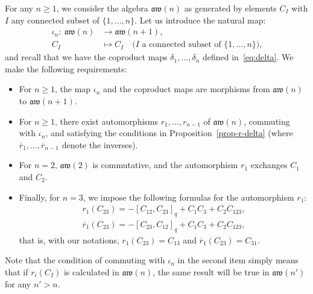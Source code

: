 \documentclass[pdftex]{sigma}
\numberwithin{equation}{section}
\theoremstyle{definition}
\newcommand{\rb}{\overline{r}}
\newcommand{\aw}{\mathfrak{aw}(n)}
\begin{document}
For any $n\geq 1$, we consider the algebra $\aw$ as generated by elements $C_I$ with $I$ any connected subset of $\{1,\dots,n\}$. Let us introduce the natural map:
\begin{align*} \iota_n\colon \ \aw & \to \mathfrak{aw}(n+1),\\
C_I & \mapsto C_I \quad \text{($I$ a connected subset of $\{1,\dots,n\}$),}
\end{align*}
and recall that we have the coproduct maps $\delta_1,\dots,\delta_n$ defined in~\eqref{eq:delta}. We make the following requirements:
\begin{itemize}\itemsep=0pt
\item[1.] For $n\geq 1$, the map $\iota_n$ and the coproduct maps are morphisms from $\mathfrak{aw}(n)$ to $\mathfrak{aw}(n+1)$.
\item[2.] For $n\geq 1$, there exist automorphisms $r_1,\dots,r_{n-1}$ of $\aw$, commuting with $\iota_n$, and satisfying the conditions in Proposition~\ref{prop-r-delta} (where $\rb_1,\dots,\rb_{n-1}$ denote the inverses).
\item[3.] For $n=2$, $\mathfrak{aw}(2)$ is commutative, and the automorphism $r_1$ exchanges $C_1$ and $C_2$.
\item[4.] Finally, for $n=3$, we impose the following formulas for the automorphism $r_1$:
\begin{gather}\label{axiomAW3}
r_1(C_{23})=-[C_{12},C_{23}]_q+C_1C_3+C_2C_{123}, \nonumber\\
\rb_1(C_{23})=-[C_{23},C_{12}]_q+C_1C_3+C_2C_{123} ,
\end{gather}
that is, with our notations, $r_1(C_{23})=C_{13}$ and $\rb_1(C_{23})=C_{31}$.
\end{itemize}
Note that the condition of commuting with $\iota_n$ in the second item simply means that if $r_i(C_I)$ is calculated in $\aw$, the same result will be true in $\mathfrak{aw}(n')$ for any $n'>n$.
\end{document}
